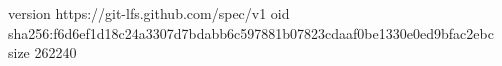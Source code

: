 version https://git-lfs.github.com/spec/v1
oid sha256:f6d6ef1d18c24a3307d7bdabb6c597881b07823cdaaf0be1330e0ed9bfac2ebc
size 262240
